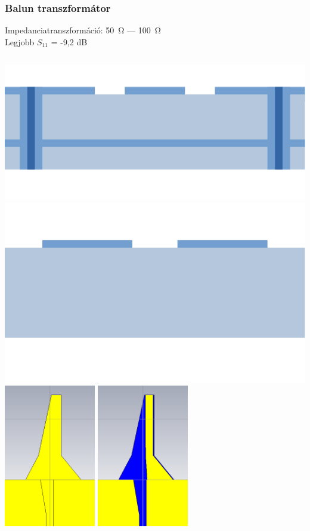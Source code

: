 \documentclass[aspectratio=43]{beamer}
\begin{document}
\begin{frame}
	\frametitle{Balun transzformátor}
		\centering
		Impedanciatranszformáció: \SI{50}{\ohm} --- \SI{100}{\ohm} \\
		Legjobb $S_{11}$ = -9,2 dB \\
		\vspace{\fill}
		\begin{columns}
				\centering
				\includegraphics[width=\textwidth]{cpw.pdf}
				\includegraphics[width=\textwidth]{cps.pdf}
				\centering
				\includegraphics[width=0.3\textwidth]{balun_1.png}
				\includegraphics[width=0.3\textwidth]{balun_2.png}

\end{columns}
\end{frame}
\end{document}
